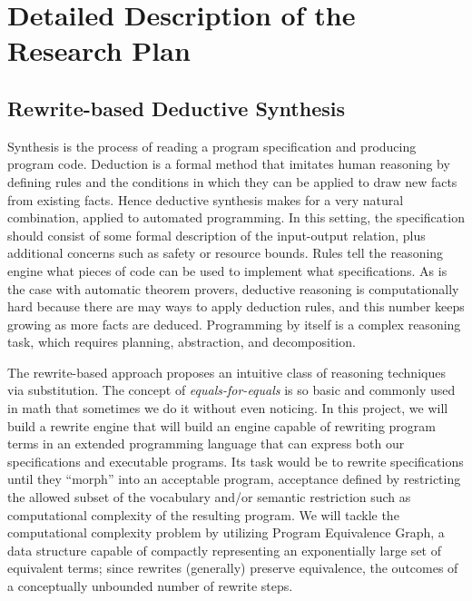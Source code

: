 \section{Detailed Description of the Research Plan}

\subsection{Rewrite-based Deductive Synthesis}

Synthesis is the process of reading a program specification and
producing program code.
Deduction is a formal method that imitates human reasoning by defining
rules and the conditions in which they can be applied to draw new facts
from existing facts.
Hence deductive synthesis makes for a very natural combination, applied
to automated programming.
In this setting, the specification should consist of some formal description
of the input-output relation, plus additional concerns such as safety or
resource bounds.
Rules tell the reasoning engine what pieces of code can be used to implement
what specifications.
As is the case with automatic theorem provers, deductive reasoning is
computationally hard because there are may ways to apply deduction rules,
and this number keeps growing as more facts are deduced.
Programming by itself is a complex reasoning task, which requires planning,
abstraction, and decomposition.

The rewrite-based approach proposes an intuitive class of reasoning techniques
via substitution.
The concept of \emph{equals-for-equals} is so basic and commonly used in math
that sometimes we do it without even noticing.
In this project, we will build a rewrite engine that will build an engine
capable of rewriting program terms in an extended programming language that
can express both our specifications and executable programs.
Its task would be to rewrite specifications until they ``morph'' into an
acceptable program, acceptance defined by restricting the allowed subset of the
vocabulary and/or semantic restriction such as computational complexity
of the resulting program.
We will tackle the computational complexity problem by utilizing Program
Equivalence Graph, a data structure capable of compactly representing an
exponentially large set of equivalent terms;
since rewrites (generally) preserve equivalence,
the outcomes of a conceptually unbounded number of rewrite steps.

